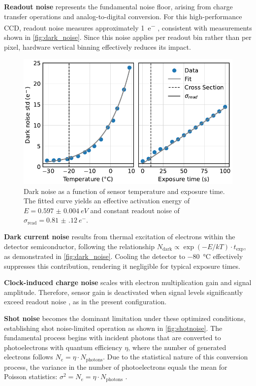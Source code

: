 \documentclass[
	parskip=half,
	a4paper,
]{scrarticle}
\begin{document}
\textbf{Readout noise} represents the fundamental noise floor, arising from charge transfer operations and analog-to-digital conversion. For this high-performance CCD, readout noise measures approximately \SI{1}{e^-} \cite{andor_ixonem_nodate}, consistent with measurements shown in \autoref{fig:dark_noise}. Since this noise applies per readout bin rather than per pixel, hardware vertical binning effectively reduces its impact.

\begin{figure}
    \centering
    \includegraphics{../analysis/figures/dark_noise.pdf}
    \caption{Dark noise as a function of sensor temperature and exposure time. The fitted curve yields an effective activation energy of $E = \SI{0.597(4)}{eV}$ and constant readout noise of $\sigma_{\text{read}} = \SI{0.81(12)}{e^-}$.}
    \label{fig:dark_noise}
\end{figure}

\textbf{Dark current noise} results from thermal excitation of electrons within the detector semiconductor, following the relationship $N_\text{dark} \propto \exp(-E / kT) \cdot t_\text{exp}$, as demonstrated in \autoref{fig:dark_noise}. Cooling the detector to \SI{-80}{\degreeCelsius} effectively suppresses this contribution, rendering it negligible for typical exposure times.

\textbf{Clock-induced charge noise} scales with electron multiplication gain and signal amplitude. Therefore, sensor gain is deactivated when signal levels significantly exceed readout noise \cite{andor_establishing_nodate}, as in the present configuration.

\textbf{Shot noise} becomes the dominant limitation under these optimized conditions, establishing shot noise-limited operation as shown in \autoref{fig:shotnoise}. The fundamental process begins with incident photons that are converted to photoelectrons with quantum efficiency $\eta$, where the number of generated electrons follows $N_e = \eta \cdot N_{\text{photons}}$. Due to the statistical nature of this conversion process, the variance in the number of photoelectrons equals the mean for Poisson statistics: $\sigma^2 = N_e = \eta \cdot N_{\text{photons}}$ \cite{european_machine_vision_association_standard_2010}.
\end{document}
